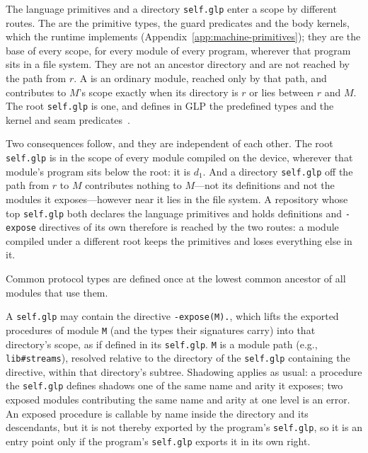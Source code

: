 The language primitives and a directory \verb|self.glp| enter a scope by different routes.  The  are the primitive types, the guard predicates and the body kernels, which the runtime implements (Appendix~\ref{app:machine-primitives}); they are the base of every scope, for every module of every program, wherever that program sits in a file system.  They are not an ancestor directory and are not reached by the path from $r$.  A  is an ordinary module, reached only by that path, and contributes to $M$'s scope exactly when its directory is $r$ or lies between $r$ and $M$.  The root \verb|self.glp| is one, and defines in GLP the predefined types and the kernel and seam predicates~\cite{shapiro2025glp}.

Two consequences follow, and they are independent of each other.  The root \verb|self.glp| is in the scope of every module compiled on the device, wherever that module's program sits below the root: it is $d_1$.  And a directory \verb|self.glp| off the path from $r$ to $M$ contributes nothing to $M$---not its definitions and not the modules it exposes---however near it lies in the file system.  A repository whose top \verb|self.glp| both declares the language primitives and holds definitions and \verb|-expose| directives of its own therefore is reached by the two routes: a module compiled under a different root keeps the primitives and loses everything else in it.

Common protocol types are defined once at the lowest common ancestor of all modules that use them.

A \verb|self.glp| may contain the directive \verb|-expose(M).|, which lifts the exported procedures of module \verb|M| (and the types their signatures carry) into that directory's scope, as if defined in its \verb|self.glp|.  \verb|M| is a module path (e.g., \verb|lib#streams|), resolved relative to the directory of the \verb|self.glp| containing the directive, within that directory's subtree.  Shadowing applies as usual: a procedure the \verb|self.glp| defines shadows one of the same name and arity it exposes; two exposed modules contributing the same name and arity at one level is an error.  An exposed procedure is callable by name inside the directory and its descendants, but it is not thereby exported by the program's \verb|self.glp|, so it is an entry point only if the program's \verb|self.glp| exports it in its own right.

